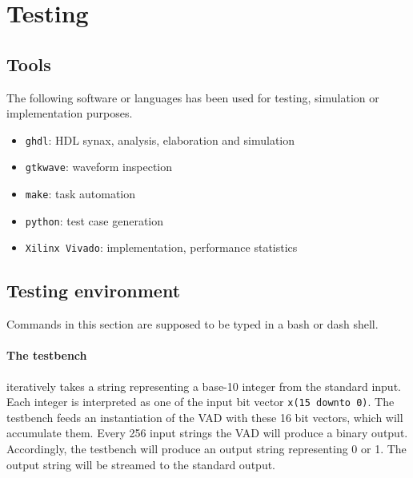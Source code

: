 \section{Testing}

\subsection{Tools}
The following software or languages has been used for testing, simulation or
implementation purposes.

\begin{itemize}
  \item \texttt{ghdl}: HDL synax, analysis, elaboration and simulation
  \item \texttt{gtkwave}: waveform inspection
  \item \texttt{make}: task automation
  \item \texttt{python}: test case generation
  \item \texttt{Xilinx Vivado}: implementation, performance statistics
\end{itemize}

\subsection{Testing environment}

Commands in this section are supposed to be typed in a bash or dash shell.

\paragraph{The testbench} iteratively takes a string representing a base-10
integer from the standard input. Each integer is interpreted
as one of the input bit vector \texttt{x(15 downto 0)}. The testbench feeds an
instantiation of the VAD with these 16 bit vectors, which will accumulate them.
Every 256 input strings the VAD will produce a binary output. Accordingly,
the testbench will produce an output string representing 0 or 1. The output
string will be streamed to the standard output.

